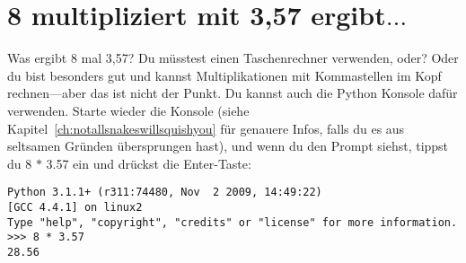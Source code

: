 

\chapter{8 multipliziert mit 3,57 ergibt$\ldots$}\label{ch:8multipliedby3.57}

Was ergibt 8 mal 3,57?  Du müsstest einen Taschenrechner verwenden, oder? Oder du bist besonders gut und kannst Multiplikationen mit Kommastellen im Kopf rechnen---aber das ist nicht der Punkt. Du kannst auch die Python Konsole dafür verwenden. Starte wieder die Konsole (siehe Kapitel~\ref{ch:notallsnakeswillsquishyou} für genauere Infos, falls du es aus seltsamen Gründen übersprungen hast), und wenn du den Prompt siehst, tippst du 8 $*$ 3.57 ein und drückst die Enter-Taste:


\begin{Verbatim}[frame=single]
Python 3.1.1+ (r311:74480, Nov  2 2009, 14:49:22)
[GCC 4.4.1] on linux2
Type "help", "copyright", "credits" or "license" for more information.
>>> 8 * 3.57
28.56
\end{Verbatim}

